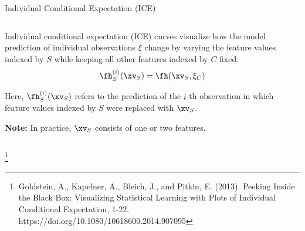 \documentclass[11pt,compress,t,notes=noshow, aspectratio=169, xcolor=table]{beamer}
\begin{document}
\begin{vbframe}{Individual Conditional Expectation (ICE)}
\begin{columns}[T]
\begin{column}{0.82\textwidth}
Individual conditional expectation (ICE) curves visualize how the model prediction of individual observations $\xi$ change by varying the feature values indexed by $S$ while keeping all other features indexed by $C$ fixed:
$$\fh_{S}^{(i)}(\xv_S) = \fh(\xv_S, \xi_C)$$

Here, $\fh_{S}^{(i)}(\xv_S)$ refers to the prediction of the $i$-th observation in which feature values indexed by $S$ were replaced with $\xv_S$.

\textbf{Note:} In practice, $\xv_S$ consists of one or two features.

\end{column}
\end{columns}



%
\footnote[frame]{Goldstein, A., Kapelner, A., Bleich, J., and Pitkin, E. (2013). Peeking Inside the Black Box: Visualizing Statistical Learning with Plots of Individual Conditional Expectation, 1-22. https://doi.org/10.1080/10618600.2014.907095}
\end{vbframe}
\end{document}
